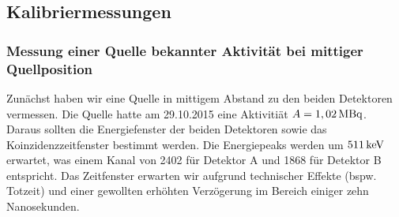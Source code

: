 \subsection{Kalibriermessungen}
    \subsubsection{Messung einer Quelle bekannter Aktivität bei mittiger Quellposition}
       Zunächst haben wir eine Quelle in mittigem Abstand zu den beiden Detektoren vermessen. Die Quelle hatte am 29.10.2015 eine Aktivitiät $A = \unit[1,02]{MBq}$.\\
       Daraus sollten die Energiefenster der beiden Detektoren sowie das Koinzidenzzeitfenster bestimmt werden. Die Energiepeaks werden um $\unit[511]{keV}$ erwartet, was einem
       Kanal von 2402 für Detektor A und 1868 für Detektor B entspricht. Das Zeitfenster erwarten wir aufgrund technischer Effekte (bspw. Totzeit) und einer gewollten
       erhöhten Verzögerung im Bereich einiger zehn Nanosekunden.  
       \vspace{2mm}
        

